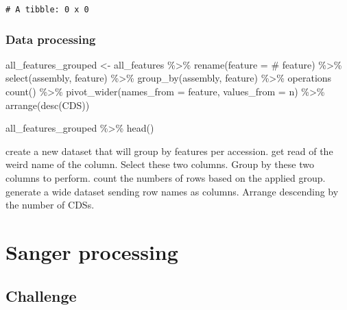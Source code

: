 \documentclass[
  letterpaper,
]{scrbook}
\newenvironment{Shaded}{\begin{snugshade}}{\end{snugshade}}
\newcommand{\AttributeTok}[1]{\textcolor[rgb]{0.40,0.46,0.14}{#1}}
\newcommand{\FunctionTok}[1]{\textcolor[rgb]{0.28,0.35,0.67}{#1}}
\newcommand{\NormalTok}[1]{\textcolor[rgb]{0.00,0.46,0.62}{#1}}
\newcommand{\OtherTok}[1]{\textcolor[rgb]{0.00,0.46,0.62}{#1}}
\newcommand{\SpecialCharTok}[1]{\textcolor[rgb]{0.37,0.37,0.37}{#1}}
\newcommand{\StringTok}[1]{\textcolor[rgb]{0.13,0.47,0.30}{#1}}
\begin{document}
\begin{verbatim}
# A tibble: 0 x 0
\end{verbatim}

\hypertarget{data-processing}{%
\subsection*{Data processing}\label{data-processing}}

\begin{Shaded}
\begin{Highlighting}[]
\NormalTok{all\_features\_grouped }\OtherTok{\textless{}{-}}\NormalTok{ all\_features }\SpecialCharTok{\%\textgreater{}\%} 
  \FunctionTok{rename}\NormalTok{(}\AttributeTok{feature =} \StringTok{\textasciigrave{}}\AttributeTok{\# feature}\StringTok{\textasciigrave{}}\NormalTok{) }\SpecialCharTok{\%\textgreater{}\%} 
  \FunctionTok{select}\NormalTok{(assembly, feature) }\SpecialCharTok{\%\textgreater{}\%} 
  \FunctionTok{group\_by}\NormalTok{(assembly, feature) }\SpecialCharTok{\%\textgreater{}\%}\NormalTok{  operations}
  \FunctionTok{count}\NormalTok{() }\SpecialCharTok{\%\textgreater{}\%} 
  \FunctionTok{pivot\_wider}\NormalTok{(}\AttributeTok{names\_from =}\NormalTok{ feature, }\AttributeTok{values\_from =}\NormalTok{ n) }\SpecialCharTok{\%\textgreater{}\%} 
  \FunctionTok{arrange}\NormalTok{(}\FunctionTok{desc}\NormalTok{(CDS))}
    
\NormalTok{all\_features\_grouped }\SpecialCharTok{\%\textgreater{}\%} 
  \FunctionTok{head}\NormalTok{()}
\end{Highlighting}
\end{Shaded}

create a new dataset that will group by features per accession. get read
of the weird name of the column. Select these two columns. Group by
these two columns to perform. count the numbers of rows based on the
applied group. generate a wide dataset sending row names as columns.
Arrange descending by the number of CDSs.

\hypertarget{sanger-processing}{%
\chapter{Sanger processing}\label{sanger-processing}}

\hypertarget{challenge-1}{%
\section*{Challenge}\label{challenge-1}}
\end{document}
